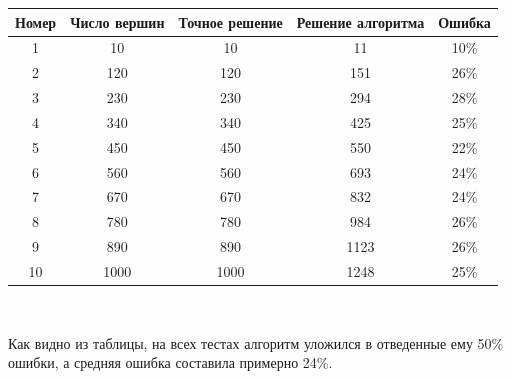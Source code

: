 \documentclass[14pt]{article}
\begin{document}
		\begin{center}
			\begin{tabular}{|c|c|c|c|c|}
			\hline
			\multicolumn{1}{|l|}{Номер} & \multicolumn{1}{l|}{Число вершин} & \multicolumn{1}{l|}{Точное решение} & \multicolumn{1}{l|}{Решение алгоритма} & \multicolumn{1}{l|}{Ошибка} \\ \hline
1                           & 10                       & 10                                  & 11                                     & 10\%                        \\ \hline
2                           & 120                      & 120                                 & 151                                    & 26\%                        \\ \hline
3                           & 230                      & 230                                 & 294                                    & 28\%                        \\ \hline
4                           & 340                      & 340                                 & 425                                    & 25\%                        \\ \hline
5                           & 450                      & 450                                 & 550                                    & 22\%                        \\ \hline
6                           & 560                      & 560                                 & 693                                    & 24\%                        \\ \hline
7                           & 670                      & 670                                 & 832                                    & 24\%                        \\ \hline
8                           & 780                      & 780                                 & 984                                    & 26\%                        \\ \hline
9                           & 890                      & 890                                 & 1123                                   & 26\%                        \\ \hline
10                          & 1000                     & 1000                                & 1248                                   & 25\%                        \\ \hline
			\end{tabular}
			
			$                 $
			
			\end{center}
			Как видно из таблицы, на всех тестах алгоритм уложился в отведенные ему 50\% ошибки, а средняя ошибка составила примерно 24\%.
	
\end{document}
